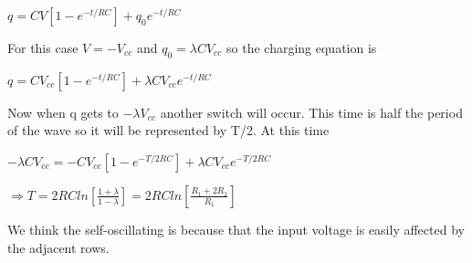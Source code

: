\documentclass[11pt]{article}
\begin{document}
$q=CV[1-e^{-t/RC}]+q_{0}e^{-t/RC}$

For this case $V=-V_{cc}$ and $q_{0}=\lambda CV_{cc}$ so the charging equation is 

$q=CV_{cc}[1-e^{-t/RC}]+\lambda CV_{cc}e^{-t/RC}$

Now when q gets to $-\lambda V_{cc}$ another switch will occur. This time is half the period of the wave so it will be represented by T/2. At this time

$-\lambda CV_{cc}=-CV_{cc}[1-e^{-T/2RC}]+\lambda CV_{cc}e^{-T/2RC}$

$\Rightarrow T=2RCln[\frac{1+\lambda}{1-\lambda}]=2RCln[\frac{R_{1}+2R_{2}}{R_{1}}]$

We think the self-oscillating is because that the input voltage is easily affected by the adjacent rows.
\end{document}
